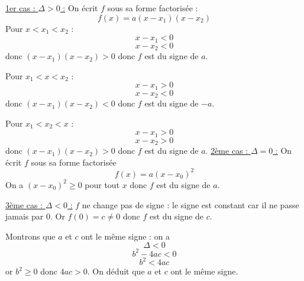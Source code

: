 \begin{preuve}
\newline\underline{1er cas : $\Delta > 0$ :} \newline
On écrit $f$ sous sa forme factorisée :
$$f(x) = a (x-x_1)(x-x_2)$$
Pour $x < x_1 < x_2$ : \newline
$$x-x_1 < 0$$ $$x-x_2 < 0$$
donc $(x-x_1)(x-x_2) > 0$ donc $f$ est du signe de $a$.\newline

Pour $x_1 < x < x_2$ : \newline
$$x-x_1 > 0$$ $$x-x_2 < 0$$
donc $(x-x_1)(x-x_2) < 0$ donc $f$ est du signe de $-a$.\newline

Pour $x_1 < x_2 < x$ : \newline
$$x-x_1 > 0$$ $$x-x_2 > 0$$
donc $(x-x_1)(x-x_2) > 0$ donc $f$ est du signe de $a$.\newline
\newline\underline{2ème cas : $\Delta = 0$ :} \newline
On écrit $f$ sous sa forme factorisée 
$$f(x) = a(x-x_0)^2$$
On a $(x-x_0)^2 \geq 0$ pour tout $x$ donc $f$ est du signe de $a$.\newline

\underline{3ème cas : $\Delta < 0$ :} \newline
$f$ ne change pas de signe : le signe est constant car il ne passe jamais par 0.\newline
Or $f(0) = c \neq 0$ donc $f$ est du signe de $c$.\newline

Montrons que $a$ et $c$ ont le même signe : on a 
$$\Delta < 0$$
$$b^2 - 4ac < 0$$
$$b^2 < 4ac$$
or $b^2 \geq 0$ donc $4ac > 0$. On déduit que $a$ et $c$ ont le même signe.
\end{preuve}

